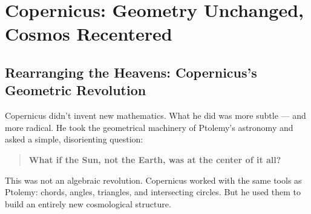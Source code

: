 \section{Copernicus: Geometry Unchanged, Cosmos Recentered}

\subsection{Rearranging the Heavens: Copernicus’s Geometric Revolution}

Copernicus didn’t invent new mathematics. What he did was more subtle — and more radical. He took the geometrical machinery of Ptolemy’s astronomy and asked a simple, disorienting question:

\begin{quote}
\textbf{What if the Sun, not the Earth, was at the center of it all?}
\end{quote}

This was not an algebraic revolution. Copernicus worked with the same tools as Ptolemy: chords, angles, triangles, and intersecting circles. But he used them to build an entirely new cosmological structure.

\medskip

